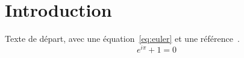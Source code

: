 \section{Introduction}

Texte de départ, avec une équation~\eqref{eq:euler} et une référence~\cite{knuth1984}.
\begin{equation}
  e^{i\pi} + 1 = 0 \label{eq:euler}
\end{equation}
